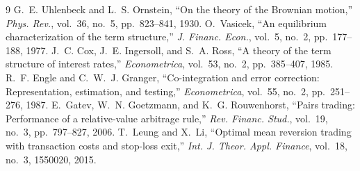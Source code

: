 \documentclass[10pt,twocolumn]{article}
\begin{document}
\begin{thebibliography}{9}
\footnotesize
\setlength{\itemsep}{1pt}
 G.~E. Uhlenbeck and L.~S. Ornstein, ``On the theory of the Brownian motion,'' \emph{Phys. Rev.}, vol.~36, no.~5, pp.~823--841, 1930.
 O.~Vasicek, ``An equilibrium characterization of the term structure,'' \emph{J. Financ. Econ.}, vol.~5, no.~2, pp.~177--188, 1977.
 J.~C. Cox, J.~E. Ingersoll, and S.~A. Ross, ``A theory of the term structure of interest rates,'' \emph{Econometrica}, vol.~53, no.~2, pp.~385--407, 1985.
 R.~F. Engle and C.~W.~J. Granger, ``Co-integration and error correction: Representation, estimation, and testing,'' \emph{Econometrica}, vol.~55, no.~2, pp.~251--276, 1987.
 E.~Gatev, W.~N. Goetzmann, and K.~G. Rouwenhorst, ``Pairs trading: Performance of a relative-value arbitrage rule,'' \emph{Rev. Financ. Stud.}, vol.~19, no.~3, pp.~797--827, 2006.
 T.~Leung and X.~Li, ``Optimal mean reversion trading with transaction costs and stop-loss exit,'' \emph{Int. J. Theor. Appl. Finance}, vol.~18, no.~3, 1550020, 2015.
\end{thebibliography}
\end{document}
